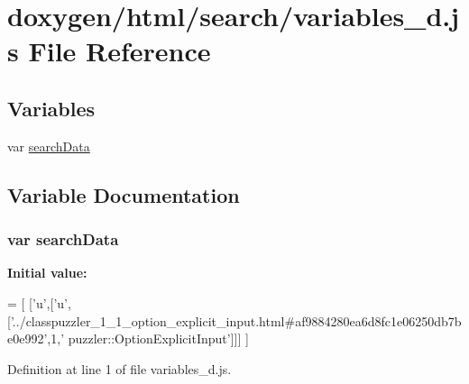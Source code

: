 \hypertarget{a00117}{}\section{doxygen/html/search/variables\+\_\+d.js File Reference}
\label{a00117}
\subsection*{Variables}
\begin{DoxyCompactItemize}
\item 
var \hyperlink{a00117_ad01a7523f103d6242ef9b0451861231e}{search\+Data}
\end{DoxyCompactItemize}


\subsection{Variable Documentation}
\hypertarget{a00117_ad01a7523f103d6242ef9b0451861231e}{}
\subsubsection[{search\+Data}]{\setlength{\rightskip}{0pt plus 5cm}var search\+Data}\label{a00117_ad01a7523f103d6242ef9b0451861231e}
{\bfseries Initial value\+:}
\begin{DoxyCode}
=
[
  [\textcolor{charliteral}{'u'},[\textcolor{charliteral}{'u'},[\textcolor{stringliteral}{'../classpuzzler\_1\_1\_option\_explicit\_input.html#af9884280ea6d8fc1e06250db7be0e992'},1,\textcolor{stringliteral}{'
      puzzler::OptionExplicitInput'}]]]
]
\end{DoxyCode}


Definition at line 1 of file variables\+\_\+d.\+js.

